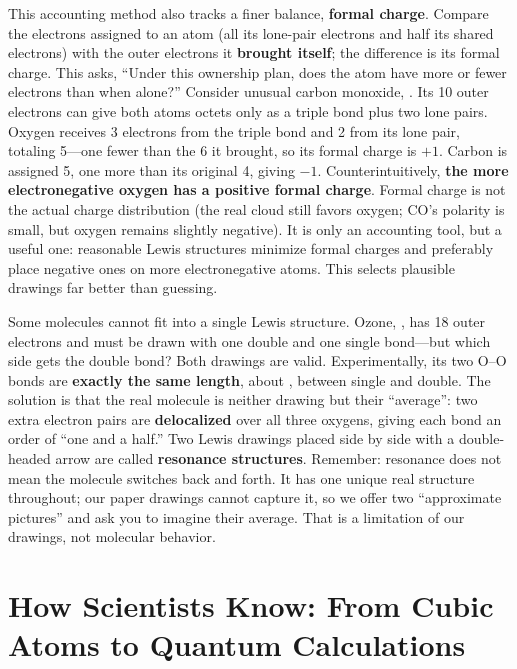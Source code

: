 This accounting method also tracks a finer balance, \textbf{formal charge}. Compare the electrons assigned to an atom (all its lone-pair electrons and half its shared electrons) with the outer electrons it \textbf{brought itself}; the difference is its formal charge. This asks, ``Under this ownership plan, does the atom have more or fewer electrons than when alone?'' Consider unusual carbon monoxide, . Its 10 outer electrons can give both atoms octets only as a triple bond plus two lone pairs. Oxygen receives 3 electrons from the triple bond and 2 from its lone pair, totaling 5---one fewer than the 6 it brought, so its formal charge is $+1$. Carbon is assigned 5, one more than its original 4, giving $-1$. Counterintuitively, \textbf{the more electronegative oxygen has a positive formal charge}. Formal charge is not the actual charge distribution (the real cloud still favors oxygen; CO's polarity is small, but oxygen remains slightly negative). It is only an accounting tool, but a useful one: reasonable Lewis structures minimize formal charges and preferably place negative ones on more electronegative atoms. This selects plausible drawings far better than guessing.

Some molecules cannot fit into a single Lewis structure. Ozone, , has 18 outer electrons and must be drawn with one double and one single bond---but which side gets the double bond? Both drawings are valid. Experimentally, its two O--O bonds are \textbf{exactly the same length}, about , between single and double. The solution is that the real molecule is neither drawing but their ``average'': two extra electron pairs are \textbf{delocalized} over all three oxygens, giving each bond an order of ``one and a half.'' Two Lewis drawings placed side by side with a double-headed arrow are called \textbf{resonance structures}. Remember: resonance does not mean the molecule switches back and forth. It has one unique real structure throughout; our paper drawings cannot capture it, so we offer two ``approximate pictures'' and ask you to imagine their average. That is a limitation of our drawings, not molecular behavior.

\section{How Scientists Know: From Cubic Atoms to Quantum Calculations}

